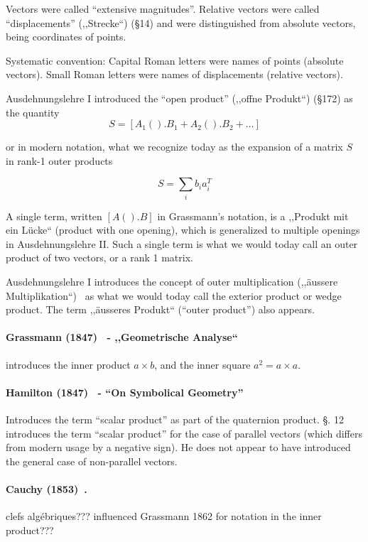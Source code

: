 Vectors were called ``extensive magnitudes''. Relative vectors were called ``displacements'' (,,Strecke``) (\S 14) and were distinguished from absolute vectors, being coordinates of points.

Systematic convention: Capital Roman letters were names of points (absolute vectors). Small Roman letters were names of displacements (relative vectors).

Ausdehnungslehre I introduced the ``open product'' (,,offne Produkt``) (\S 172) as the quantity
\[
S = [A_1().B_1 + A_2().B_2 + \dots]
\]

or in modern notation, what we recognize today as the expansion of a matrix $S$ in rank-1 outer products

\[
S = \sum_i b_i a_i^T
\]

A single term, written $[A().B]$ in Grassmann's notation, is a ,,Produkt mit ein Lücke`` (product with one opening), which is generalized to multiple openings in Ausdehnungslehre II. Such a single term is what we would today call an outer product of two vectors, or a rank 1 matrix.

Ausdehnungslehre I introduces the concept of outer multiplication (,,äussere Multiplikation``)~\cite[\S 34, p.57]{Grassmann1844}\cite[p. 81]{Grassmann1995} as what we would today call the exterior product or wedge product. The term ,,äusseres Produkt``\cite[\S 36, p. 60]{Grassmann1844} (``outer product''\cite[p. 84]{Grassmann1995}) also appears.

\paragraph{Grassmann (1847)~\cite{Grassmann1847,Grassmann1995} - ,,Geometrische Analyse``}

\cite[\S 7, p. 334]{Grassmann1995} introduces the inner product $a \times b$, and the inner square $a^2 = a \times a$.

\paragraph{Hamilton (1847)~\cite{Hamilton1847} - ``On Symbolical Geometry''}

Introduces the term ``scalar product'' as part of the quaternion product. \S. 12 introduces the term ``scalar product'' for the case of parallel vectors (which differs from modern usage by a negative sign). He does not appear to have introduced the general case of non-parallel vectors.

\paragraph{Cauchy (1853)~\cite{Cauchy1853}.} clefs algébriques??? influenced Grassmann 1862 for notation in the inner product???


